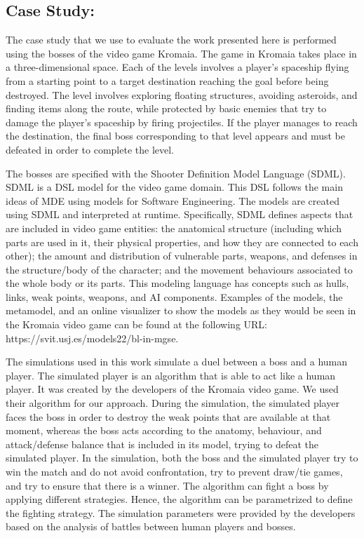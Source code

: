 \subsection{Case Study: \CaseStudy{}}
\label{subsec:case_study}

The case study that we use to evaluate the work presented here is
performed using the bosses of the video game Kromaia. The game
in Kromaia takes place in a three-dimensional space. Each of the
levels involves a player’s spaceship flying from a starting point to
a target destination reaching the goal before being destroyed. The
level involves exploring floating structures, avoiding asteroids, and
finding items along the route, while protected by basic enemies
that try to damage the player’s spaceship by firing projectiles. If
the player manages to reach the destination, the final boss corresponding
to that level appears and must be defeated in order to
complete the level.

The bosses are specified with the Shooter Definition Model Language
(SDML). SDML is a DSL model for the video game domain.
This DSL follows the main ideas of MDE using models for Software
Engineering. The models are created using SDML and interpreted
at runtime. Specifically, SDML defines aspects that are included
in video game entities: the anatomical structure (including which
parts are used in it, their physical properties, and how they are
connected to each other); the amount and distribution of vulnerable
parts, weapons, and defenses in the structure/body of the character;
and the movement behaviours associated to the whole body or its
parts. This modeling language has concepts such as hulls, links,
weak points, weapons, and AI components. Examples of the models,
the metamodel, and an online visualizer to show the models as
they would be seen in the Kromaia video game can be found at the
following URL: https://svit.usj.es/models22/bl-in-mgse. 

The simulations used in this work simulate a duel between a boss and a human player. The simulated player is an algorithm that is able
to act like a human player. It was created by the developers of the
Kromaia video game. We used their algorithm for our approach.
During the simulation, the simulated player faces the boss in order
to destroy the weak points that are available at that moment,
whereas the boss acts according to the anatomy, behaviour, and
attack/defense balance that is included in its model, trying to defeat
the simulated player. In the simulation, both the boss and the
simulated player try to win the match and do not avoid confrontation,
try to prevent draw/tie games, and try to ensure that there
is a winner. The algorithm can fight a boss by applying different
strategies. Hence, the algorithm can be parametrized to define the
fighting strategy. The simulation parameters were provided by the
developers based on the analysis of battles between human players
and bosses.

